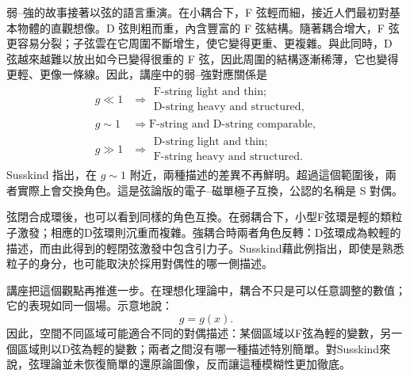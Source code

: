 弱--強的故事接著以弦的語言重演。在小耦合下，F 弦輕而細，接近人們最初對基本物體的直觀想像。D 弦則粗而重，內含豐富的 F 弦結構。隨著耦合增大，F 弦更容易分裂；子弦雲在它周圍不斷增生，使它變得更重、更複雜。與此同時，D 弦越來越難以放出如今已變得很重的 F 弦，因此周圍的結構逐漸稀薄，它也變得更輕、更像一條線。因此，講座中的弱--強對應關係是
\begin{align}
g \ll 1
&\Rightarrow
\begin{gathered}
\text{F-string light and thin;}\\
\text{D-string heavy and structured},
\end{gathered}\\
g \sim 1
&\Rightarrow
\text{F-string and D-string comparable},\\
g \gg 1
&\Rightarrow
\begin{gathered}
\text{D-string light and thin;}\\
\text{F-string heavy and structured}.
\end{gathered}
\end{align}
Susskind 指出，在 \(g\sim 1\) 附近，兩種描述的差異不再鮮明。超過這個範圍後，兩者實際上會交換角色。這是弦論版的電子--磁單極子互換，公認的名稱是 S 對偶。

弦閉合成環後，也可以看到同樣的角色互換。在弱耦合下，小型F弦環是輕的類粒子激發；相應的D弦環則沉重而複雜。強耦合時兩者角色反轉：D弦環成為較輕的描述，而由此得到的輕閉弦激發中包含引力子。Susskind藉此例指出，即使是熟悉粒子的身分，也可能取決於採用對偶性的哪一側描述。

講座把這個觀點再推進一步。在理想化理論中，耦合不只是可以任意調整的數值；它的表現如同一個場。示意地說：
\begin{equation}
g = g(x).
\end{equation}
因此，空間不同區域可能適合不同的對偶描述：某個區域以F弦為輕的變數，另一個區域則以D弦為輕的變數；兩者之間沒有哪一種描述特別簡單。對Susskind來說，弦理論並未恢復簡單的還原論圖像，反而讓這種模糊性更加徹底。


\begin{classroomqa}
\end{classroomqa}

